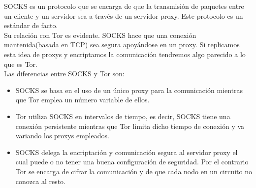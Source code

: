 SOCKS es un protocolo que se encarga de que la transmisión de paquetes entre un cliente y un servidor sea a través de un servidor proxy. Este protocolo es un estándar de facto.\\
Su relación con Tor es evidente. SOCKS hace que una conexión mantenida(basada en TCP) sea segura apoyándose en un proxy. Si replicamos esta idea de proxys y encriptamos la comunicación tendremos algo parecido a lo que es Tor.\\
Las diferencias entre SOCKS y Tor son:
\begin{itemize}
	\item SOCKS se basa en el uso de un único proxy para la comunicación mientras que Tor emplea un número variable de ellos.
	\item Tor utiliza SOCKS en intervalos de tiempo, es decir, SOCKS tiene una conexión persistente mientras que Tor limita dicho tiempo de conexión y va variando los proxys empleados.
	\item SOCKS delega la encriptación y comunicación segura al servidor proxy el cual puede o no tener una buena configuración de seguridad. Por el contrario Tor se encarga de cifrar la comunicación y de que cada nodo en un circuito no conozca al resto.
\end{itemize}